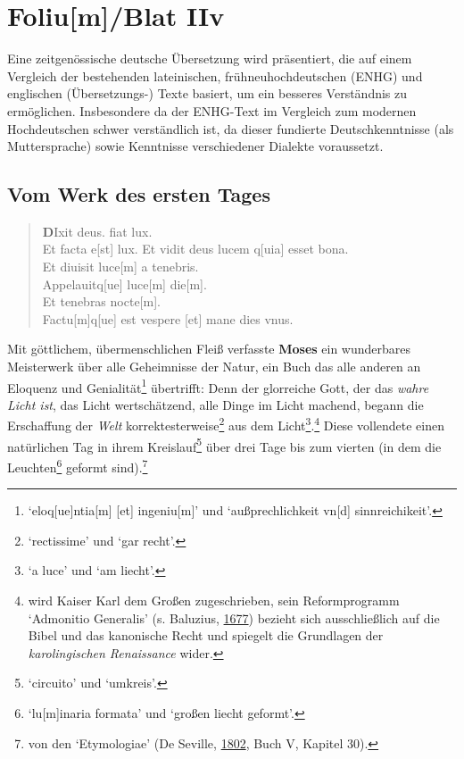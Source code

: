 \documentclass[
]{article}
\author{Dietmar Gerald Schrausser}
\date{09.05.2026}
\begin{document}
\hypertarget{foliumblat-iiv}{%
\section{Foliu{[}m{]}/Blat IIv}\label{foliumblat-iiv}}

Eine zeitgenössische deutsche Übersetzung wird präsentiert, die auf
einem Vergleich der bestehenden lateinischen, frühneuhochdeutschen
(ENHG) und englischen (Übersetzungs-) Texte basiert, um ein besseres
Verständnis zu ermöglichen. Insbesondere da der ENHG-Text im Vergleich
zum modernen Hochdeutschen schwer verständlich ist, da dieser fundierte
Deutschkenntnisse (als Muttersprache) sowie Kenntnisse verschiedener
Dialekte voraussetzt.

\hypertarget{vom-werk-des-ersten-tages}{%
\subsection{Vom Werk des ersten Tages}\label{vom-werk-des-ersten-tages}}

\begin{quote}
\textbf{D}Ixit deus. fiat lux.\\
Et facta e{[}st{]} lux. Et vidit deus lucem q{[}uia{]} esset bona.\\
Et diuisit luce{[}m{]} a tenebris.\\
Appelauitq{[}ue{]} luce{[}m{]} die{[}m{]}.\\
Et tenebras nocte{[}m{]}.\\
Factu{[}m{]}q{[}ue{]} est vespere {[}et{]} mane dies vnus.
\end{quote}

Mit göttlichem, übermenschlichen Fleiß verfasste \textbf{Moses} ein
wunderbares Meisterwerk über alle Geheimnisse der Natur, ein Buch das
alle anderen an Eloquenz und Genialität\footnote{`eloq{[}ue{]}ntia{[}m{]}
  {[}et{]} ingeniu{[}m{]}' und `außprechlichkeit vn{[}d{]}
  sinnreichikeit'.} übertrifft: Denn der glorreiche Gott, der das
\emph{wahre Licht ist}, das Licht wertschätzend, alle Dinge im Licht
machend, begann die Erschaffung der \emph{Welt}
korrektesterweise\footnote{`rectissime' und `gar recht'.} aus dem
Licht\footnote{`a luce' und `am liecht'.}.\footnote{wird Kaiser Karl dem
  Großen zugeschrieben, sein Reformprogramm `Admonitio Generalis' (s.
  Baluzius,
  \href{https://digital.ub.uni-paderborn.de/eab/content/zoom/1075337}{1677})
  bezieht sich ausschließlich auf die Bibel und das kanonische Recht und
  spiegelt die Grundlagen der \emph{karolingischen Renaissance} wider.}
Diese vollendete einen natürlichen Tag in ihrem Kreislauf\footnote{`circuito'
  und `umkreis'.} über drei Tage bis zum vierten (in dem die
Leuchten\footnote{`lu{[}m{]}inaria formata' und `großen liecht geformt'.}
geformt sind).\footnote{von den `Etymologiae' (De Seville,
  \href{https://books.google.com/books?id=wb8Z_vlSyJwC}{1802}, Buch V,
  Kapitel 30).}
\end{document}

